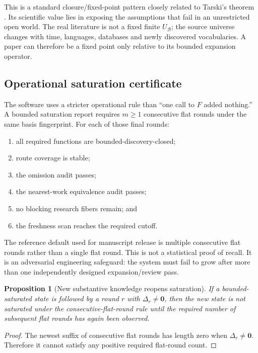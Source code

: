 \documentclass[11pt]{article}
\newtheorem{proposition}{Proposition}
\begin{document}
This is a standard closure/fixed-point pattern closely related to Tarski's theorem \cite{tarski1955}. Its scientific value lies in exposing the assumptions that fail in an unrestricted open world. The real literature is not a fixed finite \(U_{\mathcal B}\); the source universe changes with time, languages, databases and newly discovered vocabularies. A paper can therefore be a fixed point only relative to its bounded expansion operator.

\subsection{Operational saturation certificate}

The software uses a stricter operational rule than ``one call to \(F\) added nothing.'' A bounded saturation report requires \(m\ge1\) consecutive flat rounds under the same basis fingerprint. For each of those final rounds:

\begin{enumerate}[leftmargin=*]
\item all required functions are bounded-discovery-closed;
\item route coverage is stable;
\item the omission audit passes;
\item the nearest-work equivalence audit passes;
\item no blocking research fibers remain; and
\item the freshness scan reaches the required cutoff.
\end{enumerate}

The reference default used for manuscript release is multiple consecutive flat rounds rather than a single flat round. This is not a statistical proof of recall. It is an adversarial engineering safeguard: the system must fail to grow after more than one independently designed expansion/review pass.

\begin{proposition}[New substantive knowledge reopens saturation]
If a bounded-saturated state is followed by a round \(r\) with \(\Delta_r\ne\mathbf0\), then the new state is not saturated under the consecutive-flat-round rule until the required number of subsequent flat rounds has again been observed.
\end{proposition}

\begin{proof}
The newest suffix of consecutive flat rounds has length zero when \(\Delta_r\ne\mathbf0\). Therefore it cannot satisfy any positive required flat-round count.
\end{proof}
\end{document}
